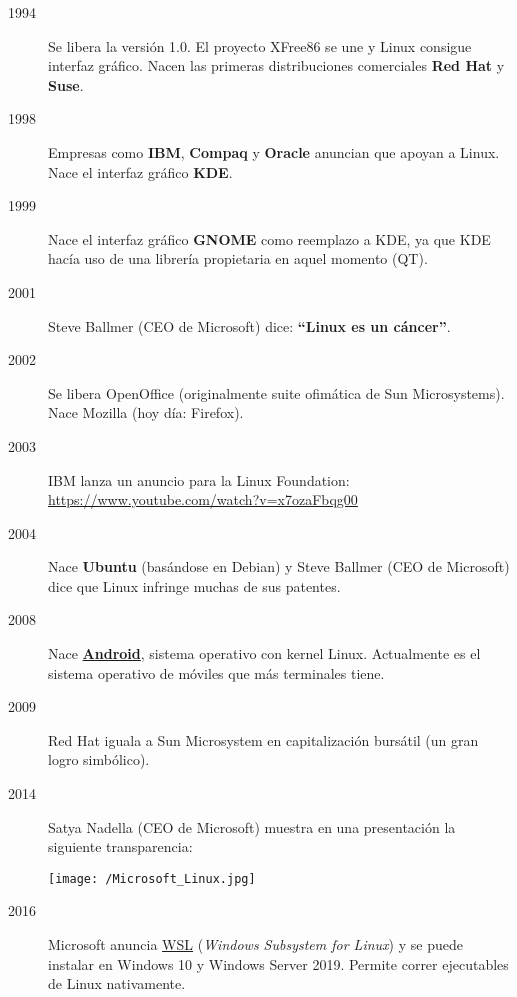 \begin{description}
\item[1994] Se libera la versión 1.0. El proyecto XFree86 se une y Linux consigue interfaz gráfico. Nacen las primeras distribuciones comerciales \textbf{Red Hat} y \textbf{Suse}.

\item[1998] Empresas como \textbf{IBM}, \textbf{Compaq} y \textbf{Oracle} anuncian que apoyan a Linux. Nace el interfaz gráfico \textbf{KDE}.

\item[1999] Nace el interfaz gráfico \textbf{GNOME} como reemplazo a KDE, ya que KDE hacía uso de una librería propietaria en aquel momento (QT).

\item[2001] Steve Ballmer (CEO de Microsoft) dice: \textbf{“Linux es un cáncer”}.

\item[2002] Se libera OpenOffice (originalmente suite ofimática de Sun Microsystems). Nace Mozilla (hoy día:  Firefox).

\item[2003] IBM lanza un anuncio para la Linux Foundation: \href{https://www.youtube.com/watch?v=x7ozaFbqg00}{https://www.youtube.com/watch?v=x7ozaFbqg00}

\item[2004] Nace \textbf{Ubuntu} (basándose en Debian) y Steve Ballmer (CEO de Microsoft) dice que Linux infringe muchas de sus patentes.

\item[2008] Nace \textbf{\href{https://es.wikipedia.org/wiki/Android}{Android}}, sistema operativo con kernel Linux. Actualmente es el sistema operativo de móviles que más terminales tiene.

\item[2009] Red Hat iguala a Sun Microsystem en capitalización bursátil (un gran logro simbólico).

\item[2014] Satya Nadella (CEO de Microsoft) muestra en una presentación la siguiente transparencia:

\begin{center}
  \texttt{[image: /Microsoft\_Linux.jpg]}
  \vspace{-10pt}
\end{center}


\item[2016]
Microsoft anuncia \href{https://es.wikipedia.org/wiki/Windows_Subsystem_for_Linux}{WSL} (\textit{Windows Subsystem for Linux}) y se puede instalar en Windows 10 y Windows Server 2019. Permite correr ejecutables de Linux nativamente.

\end{description}

